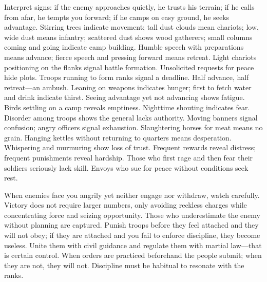 \documentclass[12pt]{book}
\begin{document}
{Interpret signs: if the enemy approaches quietly, he trusts his terrain; if he calls from afar, he tempts you forward; if he camps on easy ground, he seeks advantage. Stirring trees indicate movement; tall dust clouds mean chariots; low, wide dust means infantry; scattered dust shows wood gatherers; small columns coming and going indicate camp building. Humble speech with preparations means advance; fierce speech and pressing forward means retreat. Light chariots positioning on the flanks signal battle formation. Unsolicited requests for peace hide plots. Troops running to form ranks signal a deadline. Half advance, half retreat—an ambush. Leaning on weapons indicates hunger; first to fetch water and drink indicate thirst. Seeing advantage yet not advancing shows fatigue. Birds settling on a camp reveals emptiness. Nighttime shouting indicates fear. Disorder among troops shows the general lacks authority. Moving banners signal confusion; angry officers signal exhaustion. Slaughtering horses for meat means no grain. Hanging kettles without returning to quarters means desperation. Whispering and murmuring show loss of trust. Frequent rewards reveal distress; frequent punishments reveal hardship. Those who first rage and then fear their soldiers seriously lack skill. Envoys who sue for peace without conditions seek rest.

When enemies face you angrily yet neither engage nor withdraw, watch carefully. Victory does not require larger numbers, only avoiding reckless charges while concentrating force and seizing opportunity. Those who underestimate the enemy without planning are captured. Punish troops before they feel attached and they will not obey; if they are attached and you fail to enforce discipline, they become useless. Unite them with civil guidance and regulate them with martial law—that is certain control. When orders are practiced beforehand the people submit; when they are not, they will not. Discipline must be habitual to resonate with the ranks.}
\end{document}
